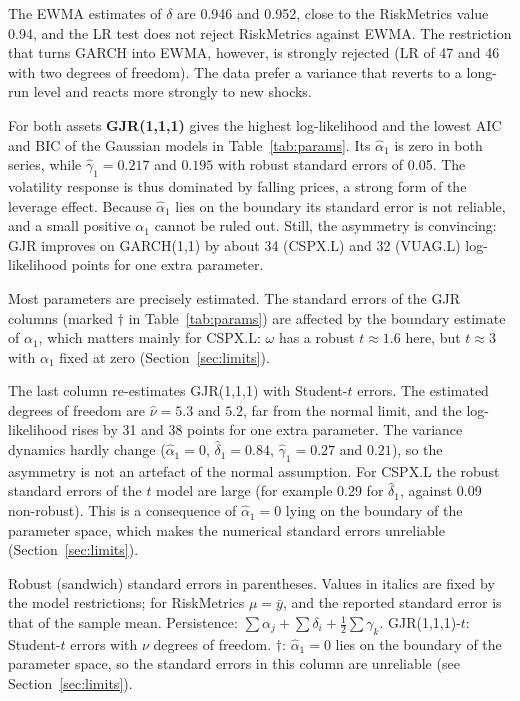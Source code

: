 \documentclass[10pt,a4paper]{article}
\begin{document}
The EWMA estimates of $\delta$ are 0.946 and 0.952, close to the RiskMetrics value 0.94, and the LR test
does not reject RiskMetrics against EWMA. The restriction that turns GARCH into EWMA, however, is
strongly rejected (LR of 47 and 46 with two degrees of freedom). The data prefer a variance that reverts
to a long-run level and reacts more strongly to new shocks.

For both assets \textbf{GJR(1,1,1)} gives the highest log-likelihood and the lowest AIC and BIC of the
Gaussian models in Table~\ref{tab:params}. Its
$\hat\alpha_1$ is zero in both series, while $\hat\gamma_1=0.217$ and $0.195$ with robust standard errors
of 0.05. The volatility response is thus dominated by falling prices, a strong form of the leverage
effect. Because $\hat\alpha_1$ lies on the boundary its standard
error is not reliable, and a small positive $\alpha_1$ cannot be ruled out. Still, the asymmetry is convincing: GJR improves on GARCH(1,1) by about 34 (CSPX.L) and 32 (VUAG.L)
log-likelihood points for one extra parameter.

Most parameters are precisely estimated. The standard errors of the GJR columns (marked $\dagger$ in
Table~\ref{tab:params}) are affected by the boundary estimate of $\alpha_1$, which matters mainly for
CSPX.L: $\omega$ has a robust $t\approx1.6$ here, but $t\approx3$ with $\alpha_1$ fixed at zero
(Section~\ref{sec:limits}).

The last column re-estimates GJR(1,1,1) with Student-$t$ errors. The estimated degrees of freedom are
$\hat\nu=5.3$ and $5.2$, far from the normal limit, and the log-likelihood rises by 31 and 38 points for
one extra parameter. The variance dynamics hardly change ($\hat\alpha_1=0$, $\hat\delta_1=0.84$,
$\hat\gamma_1=0.27$ and $0.21$), so the asymmetry is not an artefact of the normal assumption. For CSPX.L
the robust standard errors of the $t$ model are large (for example 0.29 for $\hat\delta_1$, against 0.09
non-robust). This is a consequence of $\hat\alpha_1=0$ lying on the boundary of the parameter space, which
makes the numerical standard errors unreliable (Section~\ref{sec:limits}).

\begin{table}[htbp]
\centering
\caption{Parameter estimates and model comparison}\label{tab:params}
\footnotesize

\par\smallskip
\begin{minipage}{0.95\textwidth}\footnotesize
Robust (sandwich) standard errors in parentheses. Values in italics are fixed by the model restrictions;
for RiskMetrics $\mu=\bar y$, and the reported standard error is that of the sample mean. Persistence:
$\sum\alpha_j+\sum\delta_i+\frac12\sum\gamma_k$. GJR(1,1,1)-$t$: Student-$t$ errors with $\nu$
degrees of freedom. $\dagger$: $\hat\alpha_1=0$ lies on the boundary of the parameter space, so the standard
errors in this column are unreliable (see Section~\ref{sec:limits}).
\end{minipage}
\end{table}
\end{document}
